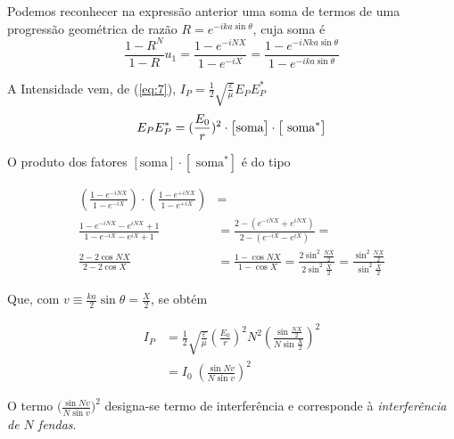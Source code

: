 \documentclass[a4paper,12pt]{article}
\begin{document}
Podemos reconhecer na expressão anterior uma soma de termos de uma progressão geométrica de razão $R = e^{-i k a \sin \theta}$, cuja soma 
é 
\begin{equation}
	\frac{1-R^N}{1-R} u_1  = \frac{1-e^{-i N X}}{1-e^{-i X}} = \frac{1-e^{-i N k a \sin \theta}}{1-e^{-i k a \sin \theta}} \label{eq:40}
\end{equation}


A Intensidade vem, de (\ref{eq:7}),  $I_P  =\frac{1}{2} \sqrt{\frac{ \varepsilon}{\mu}} E_P E_P^*$ 
\begin{equation}
	E_P E_P^* = (\frac{E_0}{r})^2 \cdot  \big[\text{soma} \big] \cdot \big[\text{ soma}^* \big] \label{eq:41}\\
\end{equation}

O produto dos fatores $ [\text{soma} ] \cdot [\text{ soma}^* ]$ é do tipo 

\begin{align}
\label{eq:42} 
 \left( \frac{1-e^{-i N X}}{1-e^{-i X}} \right) \cdot \left( \frac{1-e^{+i N X}}{1-e^{+i X}}  \right)  &= \nonumber\\
%
%
	 \frac{1-e^{-i N X}-e^{i N X}+1}{1-e^{-i X} -e^{i X} +1} &= \frac{2-(e^{-i N X}+e^{i N X})}{2-(e^{-i X} -e^{i X})} = \nonumber \\
	\frac{2- 2 \cos NX }{2- 2 \cos X} &= \frac{1- \cos NX }{1- \cos X} = \frac{2\sin^2 \frac{NX }{2} }{2\sin^2 \frac{X }{2}} = \frac{\sin^2 \frac{NX }{2} }{\sin^2 \frac{X }{2}} 
\end{align}


Que, com $v \equiv \frac{k a }{2} \sin \theta = \frac{X}{2}$, se obtém  %

\begin{align}
	I_P &= \frac{1}{2} \sqrt{\frac{ \varepsilon}{\mu}} ( \frac{E_0}{r})^2 N^2 \left( \frac{\sin\frac{NX }{2} }{N \sin \frac{X }{2}} \right)^2 \nonumber \\
	&= I_0 \; \left( \frac{\sin N v }{N \sin v} \right)^2 \label{eq:45}
\end{align}

O termo $\big( \frac{\sin N v }{N \sin v} \big)^2$ designa-se termo de interferência e corresponde à \emph{interferência de $N$ fendas}.
\end{document}
